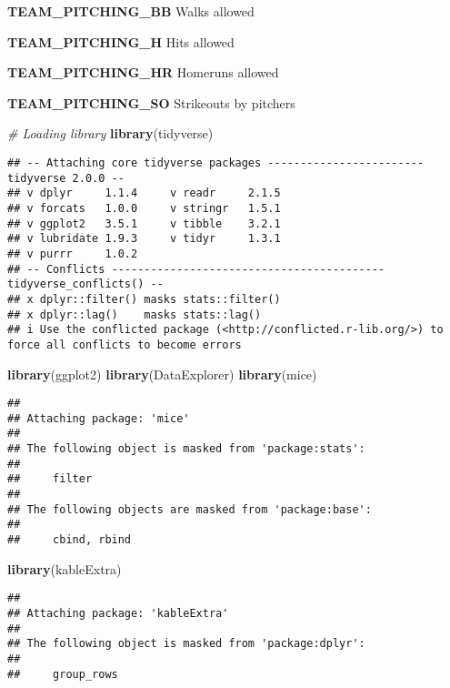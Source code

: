 \documentclass[
]{article}
\newenvironment{Shaded}{\begin{snugshade}}{\end{snugshade}}
\newcommand{\CommentTok}[1]{\textcolor[rgb]{0.56,0.35,0.01}{\textit{#1}}}
\newcommand{\FunctionTok}[1]{\textcolor[rgb]{0.13,0.29,0.53}{\textbf{#1}}}
\newcommand{\NormalTok}[1]{#1}
\begin{document}
\textbf{TEAM\_PITCHING\_BB} Walks allowed

\textbf{TEAM\_PITCHING\_H} Hits allowed

\textbf{TEAM\_PITCHING\_HR} Homeruns allowed

\textbf{TEAM\_PITCHING\_SO} Strikeouts by pitchers

\begin{Shaded}
\begin{Highlighting}[]
\CommentTok{\# Loading library}
\FunctionTok{library}\NormalTok{(tidyverse)}
\end{Highlighting}
\end{Shaded}

\begin{verbatim}
## -- Attaching core tidyverse packages ------------------------ tidyverse 2.0.0 --
## v dplyr     1.1.4     v readr     2.1.5
## v forcats   1.0.0     v stringr   1.5.1
## v ggplot2   3.5.1     v tibble    3.2.1
## v lubridate 1.9.3     v tidyr     1.3.1
## v purrr     1.0.2     
## -- Conflicts ------------------------------------------ tidyverse_conflicts() --
## x dplyr::filter() masks stats::filter()
## x dplyr::lag()    masks stats::lag()
## i Use the conflicted package (<http://conflicted.r-lib.org/>) to force all conflicts to become errors
\end{verbatim}

\begin{Shaded}
\begin{Highlighting}[]
\FunctionTok{library}\NormalTok{(ggplot2)}
\FunctionTok{library}\NormalTok{(DataExplorer)}
\FunctionTok{library}\NormalTok{(mice)}
\end{Highlighting}
\end{Shaded}

\begin{verbatim}
## 
## Attaching package: 'mice'
## 
## The following object is masked from 'package:stats':
## 
##     filter
## 
## The following objects are masked from 'package:base':
## 
##     cbind, rbind
\end{verbatim}

\begin{Shaded}
\begin{Highlighting}[]
\FunctionTok{library}\NormalTok{(kableExtra)}
\end{Highlighting}
\end{Shaded}

\begin{verbatim}
## 
## Attaching package: 'kableExtra'
## 
## The following object is masked from 'package:dplyr':
## 
##     group_rows
\end{verbatim}
\end{document}

